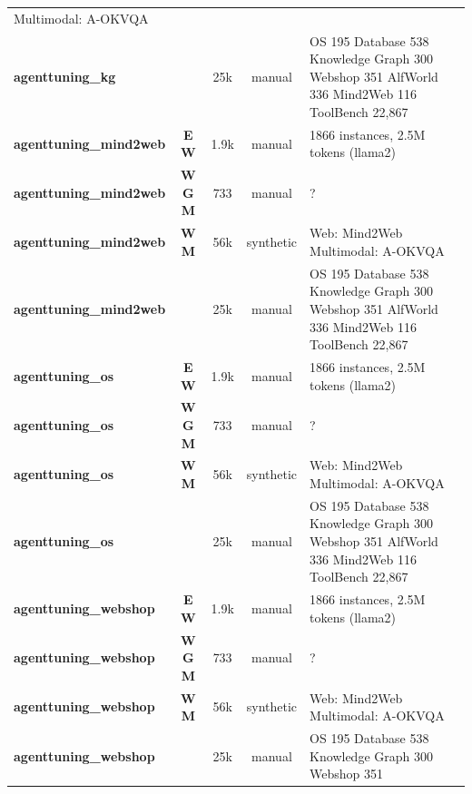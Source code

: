 \begin{table}[t]
\begin{tabular*}{\textwidth}{@{\extracolsep{\fill}}l c c c p{5cm}}
Multimodal: A-OKVQA \\
        \textbf{agenttuning\_kg \cite{agent_flan_designing_2403_12881}} &  & 25k & manual & OS 195
Database 538
Knowledge Graph 300
Webshop 351
AlfWorld 336
Mind2Web 116
ToolBench 22,867 \\
        \textbf{agenttuning\_mind2web \cite{agenttuning_enabling_2310_12823}} & \textbf{E} \textbf{W} & 1.9k & manual & 1866 instances, 2.5M tokens (llama2) \\
        \textbf{agenttuning\_mind2web \cite{webvoyager_building__2401_13919}} & \textbf{W} \textbf{G} \textbf{M} & 733 & manual & ? \\
        \textbf{agenttuning\_mind2web \cite{agent_lumos_unified__2311_05657}} & \textbf{W} \textbf{M} & 56k & synthetic & Web: Mind2Web
Multimodal: A-OKVQA \\
        \textbf{agenttuning\_mind2web \cite{agent_flan_designing_2403_12881}} &  & 25k & manual & OS 195
Database 538
Knowledge Graph 300
Webshop 351
AlfWorld 336
Mind2Web 116
ToolBench 22,867 \\
        \textbf{agenttuning\_os \cite{agenttuning_enabling_2310_12823}} & \textbf{E} \textbf{W} & 1.9k & manual & 1866 instances, 2.5M tokens (llama2) \\
        \textbf{agenttuning\_os \cite{webvoyager_building__2401_13919}} & \textbf{W} \textbf{G} \textbf{M} & 733 & manual & ? \\
        \textbf{agenttuning\_os \cite{agent_lumos_unified__2311_05657}} & \textbf{W} \textbf{M} & 56k & synthetic & Web: Mind2Web
Multimodal: A-OKVQA \\
        \textbf{agenttuning\_os \cite{agent_flan_designing_2403_12881}} &  & 25k & manual & OS 195
Database 538
Knowledge Graph 300
Webshop 351
AlfWorld 336
Mind2Web 116
ToolBench 22,867 \\
        \textbf{agenttuning\_webshop \cite{agenttuning_enabling_2310_12823}} & \textbf{E} \textbf{W} & 1.9k & manual & 1866 instances, 2.5M tokens (llama2) \\
        \textbf{agenttuning\_webshop \cite{webvoyager_building__2401_13919}} & \textbf{W} \textbf{G} \textbf{M} & 733 & manual & ? \\
        \textbf{agenttuning\_webshop \cite{agent_lumos_unified__2311_05657}} & \textbf{W} \textbf{M} & 56k & synthetic & Web: Mind2Web
Multimodal: A-OKVQA \\
        \textbf{agenttuning\_webshop \cite{agent_flan_designing_2403_12881}} &  & 25k & manual & OS 195
Database 538
Knowledge Graph 300
Webshop 351

\end{tabular*}
\end{table}
